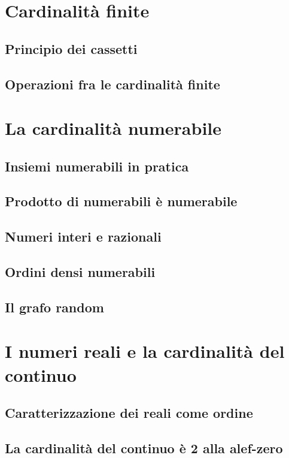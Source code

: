 \documentclass[11pt]{scrartcl}
\begin{document}
\newpage
\section{Cardinalità finite}
\subsection{Principio dei cassetti}
\newpage
\subsection{Operazioni fra le cardinalità finite}




\newpage
\section{La cardinalità numerabile}
\subsection{Insiemi numerabili in pratica}
\newpage
\subsection{Prodotto di numerabili è numerabile}
\newpage
\subsection{Numeri interi e razionali}
\newpage
\subsection{Ordini densi numerabili}
\newpage
\subsection{Il grafo random}




\newpage
\section{I numeri reali e la cardinalità del continuo}
\subsection{Caratterizzazione dei reali come ordine}
\newpage
\subsection{La cardinalità del continuo è 2 alla alef-zero}
\newpage
\end{document}
